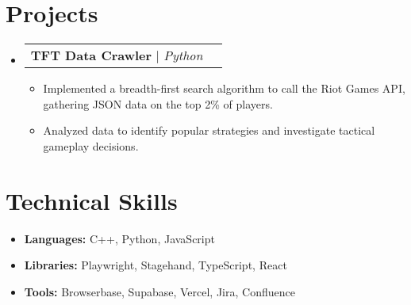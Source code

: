 \documentclass[letterpaper,11pt]{article}
\makeatletter
\newcommand{\resumeItem}[1]{
  \item\small{ {#1 \vspace{-2pt}} }
}
\newcommand{\resumeProjectHeading}[2]{
    \item
    \begin{tabular*}{1.0\textwidth}{l@{\extracolsep{\fill}}r}
      \small #1 & \textbf{\small #2} \\
    \end{tabular*}\vspace{-7pt}
}
\newcommand{\resumeSubHeadingListStart}{\begin{itemize}[leftmargin=0in, label={}]}
\newcommand{\resumeSubHeadingListEnd}{\end{itemize}}
\newcommand{\resumeItemListStart}{\begin{itemize}}
\newcommand{\resumeItemListEnd}{\end{itemize}\vspace{-5pt}}
\makeatother
\begin{document}
\section{Projects}
\resumeSubHeadingListStart
    \resumeProjectHeading
      {\textbf{TFT Data Crawler} $|$ \emph{Python}}{}
      \resumeItemListStart
          \resumeItem{Implemented a breadth-first search algorithm to call the Riot Games API, gathering JSON data on the top 2\% of players.}
          \resumeItem{Analyzed data to identify popular strategies and investigate tactical gameplay decisions.}
      \resumeItemListEnd
\resumeSubHeadingListEnd

\section{Technical Skills}
\resumeSubHeadingListStart
    \resumeItem{ \textbf{Languages:} C++, Python, JavaScript}
    \resumeItem{ \textbf{Libraries:} Playwright, Stagehand, TypeScript, React}
    \resumeItem{ \textbf{Tools:} Browserbase, Supabase, Vercel, Jira, Confluence}
\resumeSubHeadingListEnd
\end{document}
